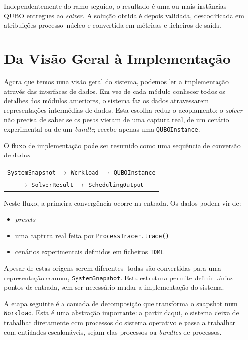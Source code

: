 Independentemente do ramo seguido, o resultado é uma ou mais instâncias
\acs{QUBO} entregues ao \textit{solver}. A solução obtida é depois validada,
descodificada em atribuições processo--núcleo e convertida em métricas e
ficheiros de saída.

\section{Da Visão Geral à Implementação}
\label{sec:arquitetura-implementacao}

Agora que temos uma visão geral do sistema, podemos ler a implementação
através das interfaces de dados. Em vez de cada módulo conhecer todos os
detalhes dos módulos anteriores, o sistema faz os dados atravessarem
representações intermédias de dados. Esta escolha reduz o acoplamento: o
\textit{solver} não precisa de saber se os pesos vieram de uma captura real, de
um cenário experimental ou de um \textit{bundle}; recebe apenas uma
\texttt{QUBOInstance}.

O fluxo de implementação pode ser resumido como uma sequência de conversão de
dados:

\begin{center}
\small
\begin{tabular}{c}
\texttt{SystemSnapshot} $\rightarrow$ \texttt{Workload} $\rightarrow$ \texttt{QUBOInstance}\\
$\rightarrow$ \texttt{SolverResult} $\rightarrow$ \texttt{SchedulingOutput}
\end{tabular}
\end{center}

Neste fluxo, a primeira convergência ocorre na entrada. Os dados podem vir de:
\begin{itemize}
    \item \textit{presets}
    \item uma captura real feita por \texttt{ProcessTracer.trace()}
    \item cenários experimentais definidos
em ficheiros \texttt{TOML}
\end{itemize}

Apesar de estas origens serem diferentes, todas são
convertidas para uma representação comum, \texttt{SystemSnapshot}. Esta
estrutura permite definir vários pontos de entrada, sem ser necessário mudar a implementação do sistema.

A etapa seguinte é a camada de decomposição que transforma o snapshot num \texttt{Workload}. Esta é uma
abstração importante: a partir daqui, o sistema deixa de trabalhar diretamente
com processos do sistema operativo e passa a trabalhar com entidades
escalonáveis, sejam elas processos ou \textit{bundles} de processos.

